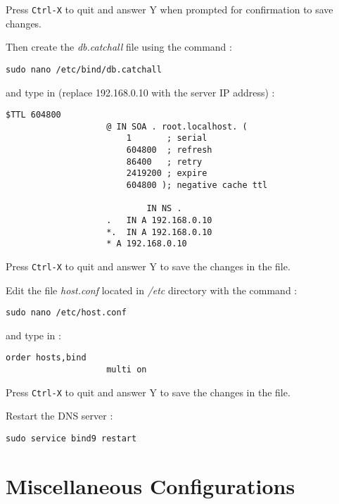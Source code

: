 \documentclass[a4paper]{ffco-rapport}
\begin{document}
		Press \verb|Ctrl-X| to quit and answer Y when prompted for confirmation to save changes.

		Then create the \emph{db.catchall} file using the command :
		
		\verb|sudo nano /etc/bind/db.catchall|
		
		and type in (replace 192.168.0.10 with the server IP address) :
		
		\lstset{tabsize=2,showspaces=false,showtabs=false,tab=\rightarrowfill}
		\begin{center}
			\ttfamily
			\begin{minipage}{10cm}
				\begin{lstlisting}[basicstyle=\small,language={},gobble=10]
					$TTL 604800
					@ IN SOA . root.localhost. (
						1       ; serial
						604800  ; refresh
						86400   ; retry
						2419200 ; expire
						604800 ); negative cache ttl

							IN NS .
					.   IN A 192.168.0.10
					*.  IN A 192.168.0.10
					* A 192.168.0.10
				\end{lstlisting}
			\end{minipage}
		\end{center}

		Press \verb|Ctrl-X| to quit and answer Y to save the changes in the file.
	
		Edit the file \emph{host.conf} located in \emph{/etc} directory with the command  :
		
		\verb|sudo nano /etc/host.conf|
		
		and type in :

		\lstset{tabsize=2,showspaces=false,showtabs=false,tab=\rightarrowfill}
		\begin{center}
			\ttfamily
			\begin{minipage}{10cm}
				\begin{lstlisting}[basicstyle=\small,language={},gobble=10]
					order hosts,bind
					multi on
				\end{lstlisting}
			\end{minipage}
		\end{center}	
	
		Press \verb|Ctrl-X| to quit and answer Y to save the changes in the file.

		Restart the DNS server :
		
		\verb|sudo service bind9 restart|
	
\section{Miscellaneous Configurations}
	
\end{document}
